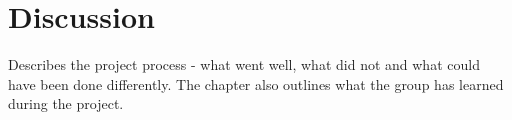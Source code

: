 \chapter{Discussion}
Describes the project process - what went well, what did not and what could have been done differently.
The chapter also outlines what the group has learned during the project.